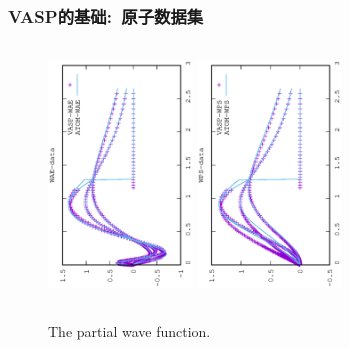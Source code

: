 \frame
{
	\frametitle{\textrm{VASP}的基础:~原子数据集}
	{\fontsize{7.2pt}{7.2pt}}
\begin{figure}[h!]
\centering
\vskip -0.5in
\includegraphics[width=1.5in,height=2.7in,viewport=0 0 350 550, angle=-90, clip]{Figures/WAE-data.eps}
\vskip -0.2in
\includegraphics[height=2.7in,width=1.5in,viewport=0 0 350 550, angle=-90, clip]{Figures/WPS-data.eps}
\caption{\tiny \textrm{The partial wave function.}}%
\label{Wave_Function}
\end{figure}
}

